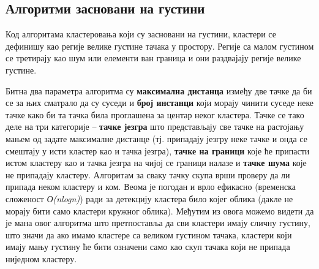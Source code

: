 \documentclass[10pt, a4paper]{article}
\begin{document}
\subsection{Алгоритми засновани на густини}
\label{subsec: podnaslov6}
Код алгоритама кластеровања који су засновани на густини, кластери се дефинишу као регије велике густине тачака у простору. Регије са малом густином се третирају као шум или елементи ван граница и они раздвајају регије велике густине.

Битна два параметра алгоритма су \textbf{максимална дистанца} између две тачке да би се за њих сматрало да су суседи и \textbf{број инстанци} који морају чинити суседе неке тачке како би та тачка била проглашена за центар неког кластера. Тачке се тако деле на три категорије – \textbf{тачке језгра} што представљају све тачке на растојању мањем од задате максималне дистанце (тј. припадају језгру неке тачке и онда се смештају у исти кластер као и тачка језгра), \textbf{тачке на граници} које ће припасти истом кластеру као и тачка језгра на чијој се граници налазе и \textbf{тачке шума} које не припадају кластеру. Алгоритам за сваку тачку скупа врши проверу да ли припада неком кластеру и ком. Веома је погодан и врло ефикасно (временска сложеност {\em О(nlogn)}) ради за детекцију кластера било којег облика (дакле не морају бити само кластери кружног облика). Међутим из овога можемо видети да је мана овог алгоритма што претпоставља да сви кластери имају сличну густину, што значи да ако имамо кластере са великом густином тачака, кластери који имају мању густину ће бити означени само као скуп тачака који не припада ниједном кластеру.
\end{document}
